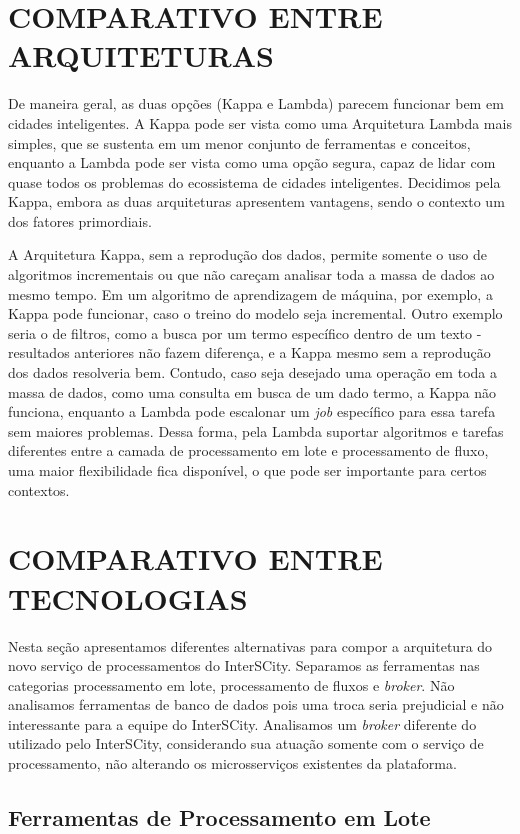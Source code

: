 \section{COMPARATIVO ENTRE ARQUITETURAS}

De maneira geral, as duas opções (Kappa e Lambda) parecem funcionar bem em
cidades inteligentes. A Kappa pode ser vista como uma Arquitetura Lambda mais
simples, que se sustenta em um menor conjunto de ferramentas e
conceitos, enquanto a Lambda pode ser vista como uma opção segura,
capaz de lidar com quase todos os problemas do ecossistema de cidades
inteligentes. Decidimos pela Kappa, embora as duas arquiteturas apresentem
vantagens, sendo o contexto um dos fatores primordiais.

A Arquitetura Kappa, sem a reprodução dos dados, permite somente o uso de
algoritmos incrementais ou que não careçam analisar toda a massa de dados ao
mesmo tempo. Em um algoritmo de aprendizagem de máquina, por exemplo, a Kappa
pode funcionar, caso o treino do modelo seja incremental. Outro exemplo
seria o de filtros, como a busca por um termo específico dentro de um texto -
resultados anteriores não fazem diferença, e a Kappa mesmo sem a reprodução
dos dados resolveria bem. Contudo, caso seja desejado uma operação em toda
a massa de dados, como uma consulta em busca de um dado termo, a Kappa
não funciona, enquanto a Lambda pode escalonar um \textit{job} específico para essa
tarefa sem maiores problemas. Dessa forma, pela Lambda suportar algoritmos e tarefas
diferentes entre a camada de processamento em lote e processamento de fluxo, uma
maior flexibilidade fica disponível, o que pode ser importante para certos
contextos.

\section{COMPARATIVO ENTRE TECNOLOGIAS}

Nesta seção apresentamos diferentes alternativas para compor a arquitetura do
novo serviço de processamentos do InterSCity. Separamos as ferramentas
nas categorias processamento em lote, processamento de fluxos
e \textit{broker}. Não analisamos ferramentas de banco de dados pois
uma troca seria prejudicial e não interessante para a equipe do InterSCity.
Analisamos um \textit{broker} diferente do utilizado pelo InterSCity,
considerando sua atuação somente com o serviço de processamento, não alterando
os microsserviços existentes da plataforma.

\subsection{Ferramentas de Processamento em Lote}

